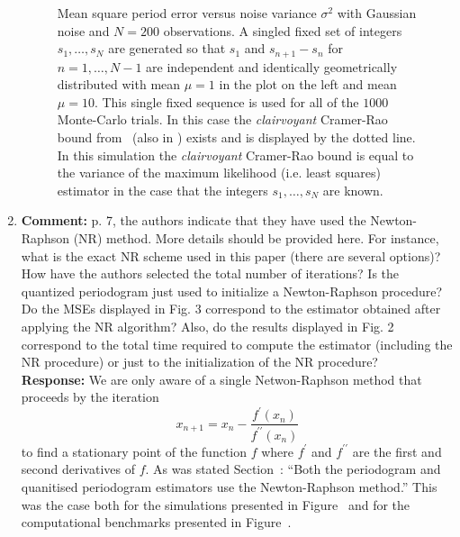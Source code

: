 \documentclass[a4paper,10pt]{article}
\begin{document}
\begin{enumerate}
\begin{figure*}[tp]
  \caption{Mean square period error versus noise variance $\sigma^2$ with Gaussian noise and $N=200$ observations.  A singled fixed set of integers $s_1,\dots,s_N$ are generated so that $s_1$ and $s_{n+1} - s_n$ for $n=1,\dots,N-1$ are independent and identically geometrically distributed with mean $\mu = 1$ in the plot on the left and mean $\mu=10$.  This single fixed sequence is used for all of the $1000$ Monte-Carlo trials.  In this case the  \emph{clairvoyant} Cramer-Rao bound from~\cite{Sidiropoulos2005} (also in \cite{726812,Clarkson2007}) exists and is displayed by the dotted line.  In this simulation the \emph{clairvoyant} Cramer-Rao bound is equal to the variance of the maximum likelihood (i.e. least squares) estimator in the case that the integers $s_1,\dots,s_N$ are known.}\label{plot:crb}
\end{figure*} 

\item\textbf{Comment:}\label{com:rev1:nr}
p. 7, the authors indicate that they have used the Newton-Raphson (NR)
method. More details should be provided here. For instance, what is the exact
NR scheme used in this paper (there are several options)? How have the
authors selected the total number of iterations? Is the quantized periodogram
just used to initialize a Newton-Raphson procedure? Do the MSEs displayed
in Fig. 3 correspond to the estimator obtained after applying the NR algorithm?
Also, do the results displayed in Fig. 2 correspond to the total time
required to compute the estimator (including the NR procedure) or just to the
initialization of the NR procedure?
\\
\textbf{Response:}
We are only aware of a single Netwon-Raphson method that proceeds by the iteration
\[
x_{n+1} = x_n - \frac{f^\prime(x_{n})}{f^{\prime\prime}(x_n)}
\]
to find a stationary point of the function $f$ where $f^\prime$ and $f^{\prime\prime}$ are the first and second derivatives of $f$.  As was stated Section~: ``Both the periodogram and quanitised periodogram estimators use the Newton-Raphson method.''  This was the case both for the simulations presented in Figure~ and for the computational benchmarks presented in Figure~.


\end{enumerate}
\end{document}

